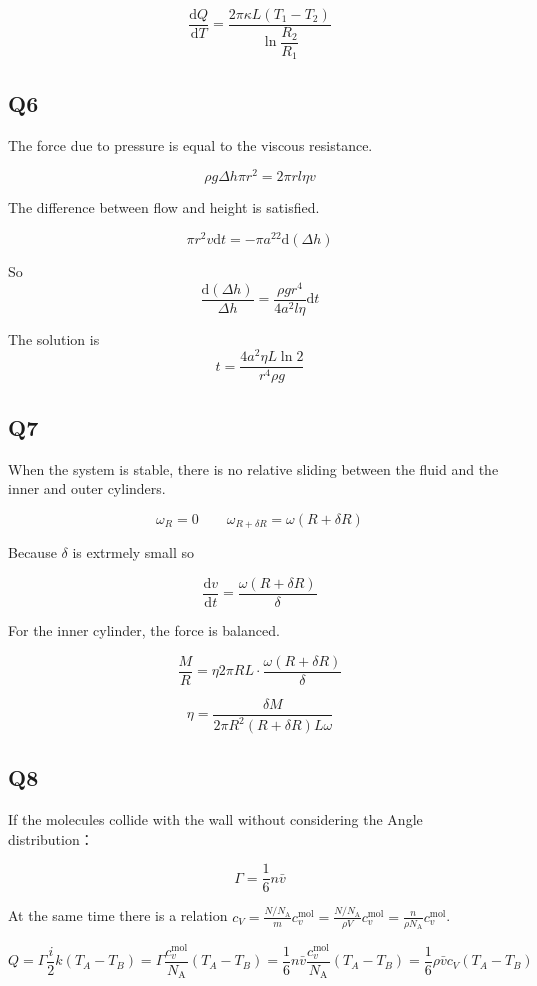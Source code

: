 \documentclass[a4paper,11pt]{amsart}
\theoremstyle{definition}
\begin{document}
	$$
	\frac{\mathrm{d}Q}{\mathrm{d}T}=\frac{2\pi \kappa L\left( T_1-T_2 \right)}{\ln \dfrac{R_2}{R_1}}
	$$
	
	\subsection*{Q6}
	
	The force due to pressure is equal to the viscous resistance.
	
	$$
	\rho g\Delta h\pi r^2=2\pi rl\eta v
	$$
	
	The difference between flow and height is satisfied.
	
	$$
	\pi r^2v\mathrm{d}t=-\pi a^22\mathrm{d}\left( \Delta h \right) 
	$$
	
	So
	$$
	\frac{\mathrm{d}\left( \Delta h \right)}{\Delta h}=\frac{\rho gr^4}{4a^2l\eta}\mathrm{d}t
	$$
	
	The solution is
	$$
	t=\frac{4a^2\eta L\ln 2}{r^4\rho g}
	$$
	
	\subsection*{Q7}
	
	When the system is stable, there is no relative sliding between the fluid and the inner and outer cylinders.
	
	$$
	\omega_R=0\qquad\omega_{R+\delta R}=\omega(R+\delta R)
	$$
	
	Because $\delta$ is extrmely small so 
	
	$$
	\dfrac{\mathrm{d}v}{\mathrm{d}t}=\dfrac{\omega(R+\delta R)}{\delta}
	$$
	
	For the inner cylinder, the force is balanced.
	
	$$
	\frac{M}{R}=\eta 2\pi RL\cdot \frac{\omega \left( R+\delta R \right)}{\delta}
	$$
	
	$$
	\eta =\frac{\delta M}{2\pi R^2\left( R+\delta R \right) L\omega}
	$$
	
	\subsection*{Q8}
	
	If the molecules collide with the wall without considering the Angle distribution：
	
	$$
	\varGamma =\frac{1}{6}n\bar{v}
	$$
	
	At the same time there is a relation $\displaystyle c_V=\frac{N/N_{\mathrm{A}}}{m}c_{v}^{\mathrm{mol}}=\frac{N/N_{\mathrm{A}}}{\rho V}c_{v}^{\mathrm{mol}}=\frac{n}{\rho N_{\mathrm{A}}}c_{v}^{\mathrm{mol}}$.
	
	$$
	Q=\varGamma \frac{i}{2}k\left( T_A-T_B \right) =\varGamma \frac{c_{v}^{\mathrm{mol}}}{N_{\mathrm{A}}}\left( T_A-T_B \right) =\frac{1}{6}n\bar{v}\frac{c_{v}^{\mathrm{mol}}}{N_{\mathrm{A}}}\left( T_A-T_B \right) =\frac{1}{6}\rho \bar{v}c_V\left( T_A-T_B \right) 
	
	$$
	
\end{document}
